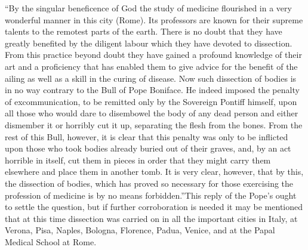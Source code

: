 \documentclass{book}
\begin{document}
“By the singular beneficence of God the study of medicine flourished in a very wonderful manner in this city (Rome). Its professors are known for their supreme talents to the remotest parts of the earth. There is no doubt that they have greatly benefited by the diligent labour which they have devoted to dissection. From this practice beyond doubt they have gained a profound knowledge of their art and a proficiency that has enabled them to give advice for the benefit of the ailing as well as a skill in the curing of disease. Now such dissection of bodies is in no way contrary to the Bull of Pope Boniface. He indeed imposed the penalty of excommunication, to be remitted only by the Sovereign Pontiff himself, upon all those who would dare to disembowel the body of any dead person and either dismember it or horribly cut it up, separating the flesh from the bones. From the rest of this Bull, however, it is clear that this penalty was only to be inflicted upon those who took bodies already buried out of their graves, and, by an act horrible in itself, cut them in pieces in order that they might carry them elsewhere and place them in another tomb. It is very clear, however, that by this, the dissection of bodies, which has proved so necessary for those exercising the profession of medicine is by no means forbidden.”\footnotemark[2] This reply of the Pope’s ought to settle the question, but if further corroboration is needed it may be mentioned that at this time dissection was carried on in all the important cities in Italy, at Verona, Pisa, Naples, Bologna, Florence, Padua, Venice, and at the Papal Medical School at Rome.
\end{document}

